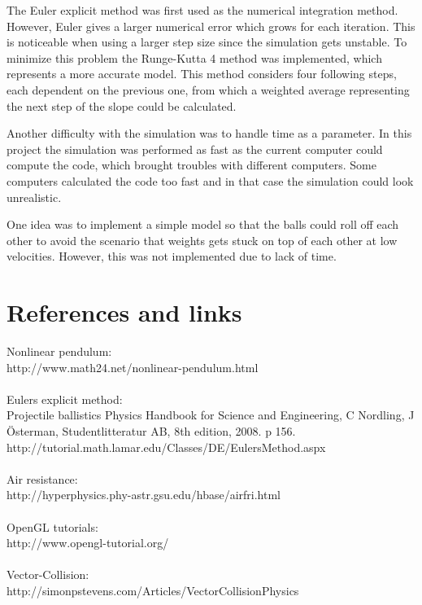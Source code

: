 \documentclass[a4paper,12pt,twoside,english]{article}
\begin{document}
The Euler explicit method was first used as the numerical integration method. However, Euler gives a larger numerical error which grows for each iteration. This is noticeable when using a larger step size since the simulation gets unstable. To minimize this problem the Runge-Kutta 4 method was implemented, which represents a more accurate model. This method considers four following steps, each dependent on the previous one, from which a weighted average representing the next step of the slope could be calculated. 

Another difficulty with the simulation was to handle time as a parameter. In this project the simulation was performed as fast as the current computer could compute the code, which brought troubles with different computers. Some computers calculated the code too fast and in that case the simulation could look unrealistic.

One idea was to implement a simple model so that the balls could roll off each other to avoid the scenario that weights gets stuck on top of each other at low velocities. However, this was not implemented due to lack of time. 

\section{References and links}

Nonlinear pendulum: \\
http://www.math24.net/nonlinear-pendulum.html \\\\
Eulers explicit method: \\
Projectile ballistics
Physics Handbook for Science and Engineering, 
C Nordling, J \"{O}sterman, Studentlitteratur AB, 8th edition, 2008. 
p 156. \\
http://tutorial.math.lamar.edu/Classes/DE/EulersMethod.aspx\\\\
Air resistance: \\
http://hyperphysics.phy-astr.gsu.edu/hbase/airfri.html\\\\
OpenGL tutorials: \\
http://www.opengl-tutorial.org/\\\\
Vector-Collision: \\
http://simonpstevens.com/Articles/VectorCollisionPhysics\\\\
\end{document}
